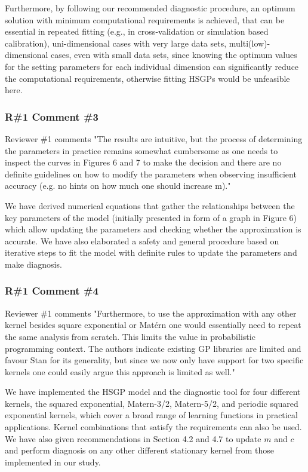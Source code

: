 \documentclass[11pt]{report}
\begin{document}
Furthermore, by following our recommended diagnostic procedure, an optimum solution with minimum computational requirements is achieved, that can be essential in repeated fitting (e.g., in cross-validation or simulation based calibration), uni-dimensional cases with very large data sets, multi(low)-dimensional cases, even with small data sets, since knowing the optimum values for the setting parameters for each individual dimension can significantly reduce the computational requirements, otherwise fitting HSGPs would be unfeasible here.

\subsubsection*{R\#1 Comment \#3}

Reviewer \#1 comments "The results are intuitive, but the process of determining the parameters in practice remains somewhat cumbersome as one needs to inspect the curves in Figures 6 and 7 to make the decision and there are no definite guidelines on how to modify the parameters when observing insufficient accuracy (e.g. no hints on how much one should increase m)."

We have derived numerical equations that gather the relationships between the key parameters of the model (initially presented in form of a graph in Figure 6) which allow updating the parameters and checking whether the approximation is accurate. We have also elaborated a safety and general procedure based on iterative steps to fit the model with definite rules to update the parameters and make diagnosis.

\subsubsection*{R\#1 Comment \#4}

Reviewer \#1 comments "Furthermore, to use the approximation with any other kernel besides square exponential or Matérn one would essentially need to repeat the same analysis from scratch. This limits the value in probabilistic programming context. The authors indicate existing GP  libraries are limited and favour Stan for its generality, but since we now only have support for two specific kernels one could easily argue this approach is limited as well."

We have implemented the HSGP model and the diagnostic tool for four different kernels, the squared exponential, Matern-3/2, Matern-5/2, and periodic squared exponential kernels, which cover a broad range of learning functions in practical applications. Kernel combinations that satisfy the requirements can also be used. We have also given recommendations in Section 4.2 and 4.7 to update $m$ and $c$ and perform diagnosis on any other different stationary kernel from those implemented in our study.
\end{document}
